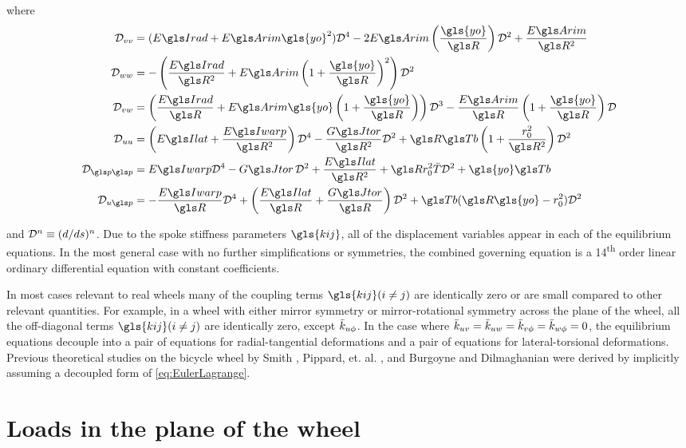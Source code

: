 \documentclass[\rootdir/thesis.tex]{subfiles}
\begin{document}
where
\begin{align*}
\D_{vv} &= (\EIr + \EA\gls{yo}^2)\D^4 - 2\EA\left(\frac{\gls{yo}}{\R}\right)\D^2 + \frac{\EA}{\R^2}\\
\D_{ww} &= -\left(\frac{\EIr}{\R^2} + \EA\left(1+\frac{\gls{yo}}{\R}\right)^2\right)\D^2\\
\D_{vw} &= \left(\frac{\EIr}{\R} + \EA\gls{yo}\left(1+\frac{\gls{yo}}{\R}\right)\right)\D^3 - \frac{\EA}{\R}\left(1+\frac{\gls{yo}}{\R}\right)\D\\
\D_{uu} &= \left(\EIl + \frac{\EIw}{\R^2}\right)\D^4 - \frac{\GJ}{\R^2}\D^2
    + \R\Tb\left(1 + \frac{\ro^2}{\R^2}\right)\D^2\\
\D_{\p\p} &= \EIw\D^4 - \GJ\,\D^2 + \frac{\EIl}{\R^2}
    + \R \ro^2\bar{T}\D^2 + \gls{yo}\Tb\\
\D_{u\p} &= -\frac{\EIw}{\R}\D^4 + \left(\frac{\EIl}{\R} + \frac{\GJ}{\R}\right)\D^2
    + \Tb(\R\gls{yo} - \ro^2)\D^2
\end{align*}

and $\mathcal{D}^n \equiv (d/ds)^n$. Due to the spoke stiffness parameters $\gls{kij}$, all of the displacement variables appear in each of the equilibrium equations. In the most general case with no further simplifications or symmetries, the combined governing equation is a 14\textsuperscript{th} order linear ordinary differential equation with constant coefficients.

In most cases relevant to real wheels many of the coupling terms $\gls{kij} (i \neq j)$ are identically zero or are small compared to other relevant quantities. For example, in a wheel with either mirror symmetry or mirror-rotational symmetry across the plane of the wheel, all the off-diagonal terms $\gls{kij} (i \neq j)$ are identically zero, except $\bar{k}_{u\phi}$. In the case where $\bar{k}_{uv}=\bar{k}_{uw}=\bar{k}_{v\phi}=\bar{k}_{w\phi}=0$, the equilibrium equations decouple into a pair of equations for radial-tangential deformations and a pair of equations for lateral-torsional deformations. Previous theoretical studies on the bicycle wheel by Smith \cite{Smith1901}, Pippard, et. al. \cite{Pippard1931,Pippard1932a,Pippard1932b}, and Burgoyne and Dilmaghanian \cite{Burgoyne1993} were derived by implicitly assuming a decoupled form of \eqref{eq:EulerLagrange}.

\section{Loads in the plane of the wheel}
\label{sec:RadTan}

\end{document}
